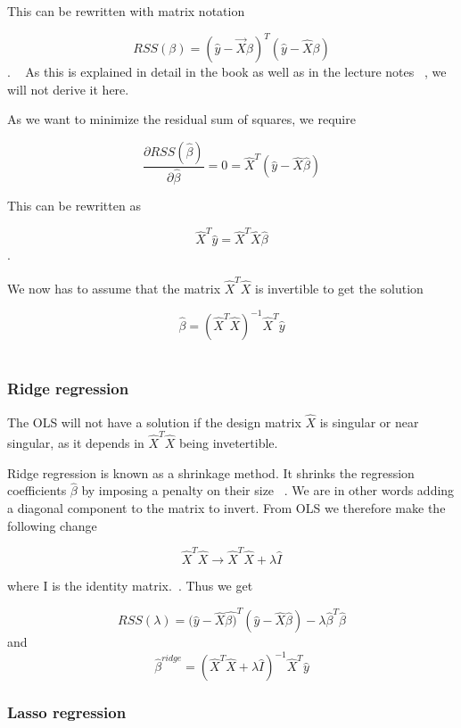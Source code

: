 This can be rewritten with matrix notation 

\begin{equation}
	RSS(\beta) = (\hat{y}-\vec{X}\beta)^T(\hat{y} - \hat{X}\beta)
\end{equation}. ~\cite{IntroStatistics} 
As this is explained in detail in the book as well as in the 
lecture notes ~\cite{Lectures-notes}, we will not derive
it here.

As we want to minimize the residual sum of squares, we require

\begin{equation}
	\frac{\partial RSS(\hat{\beta})}{\partial \hat{\beta}} 
	= 0 
	= \hat{X}^T(\hat{y} - \hat{X}\hat{\beta})
\end{equation}

This can be rewritten as 

\begin{equation}
	\hat{X}^T\hat{y} = \hat{X}^T\hat{X}\hat{\beta} 
\end{equation}.

We now has to assume that the matrix \(\hat{X}^T\hat{X}\) 
is invertible to get the solution

\begin{equation}
	\hat{\beta} = (\hat{X}^T\hat{X})^{-1}\hat{X}^T\hat{y}
\end{equation}
~\cite{Lectures-notes}~\cite{IntroStatistics}

\subsubsection{Ridge regression}
The OLS will not have a solution if the design matrix \(\hat{X}\) is singular
or near singular, as it depends in \(\hat{X}^T\hat{X}\) being invetertible. 
~\cite{Lectures-notes}

Ridge regression is known as a shrinkage method. It shrinks the regression
coefficients \(\hat{\beta}\) by imposing a penalty on their size
~\cite{IntroStatistics}. We are in other words adding a diagonal component
to the matrix to invert. From OLS we therefore make the following change

\begin{equation}
	\hat{X}^T\hat{X} \rightarrow \hat{X}^T\hat{X} + \lambda \hat{I}
\end{equation}

where I is the identity matrix.~\cite{Lectures-notes}.
Thus we get 

\begin{equation}
	RSS(\lambda) = (\hat{y}-\hat{X}\hat{\beta)}^T(\hat{y} 
	- \hat{X}\hat{\beta})
	- \lambda \hat{\beta}^T\hat{\beta}
\end{equation}
and
\begin{equation}
	\hat{\beta}^{ridge} = (\hat{X}^T\hat{X} 
	+ \lambda \hat{I})^{-1}\hat{X}^T\hat{y} 
\end{equation}
\cite{IntroStatistics}

\subsubsection{Lasso regression}








